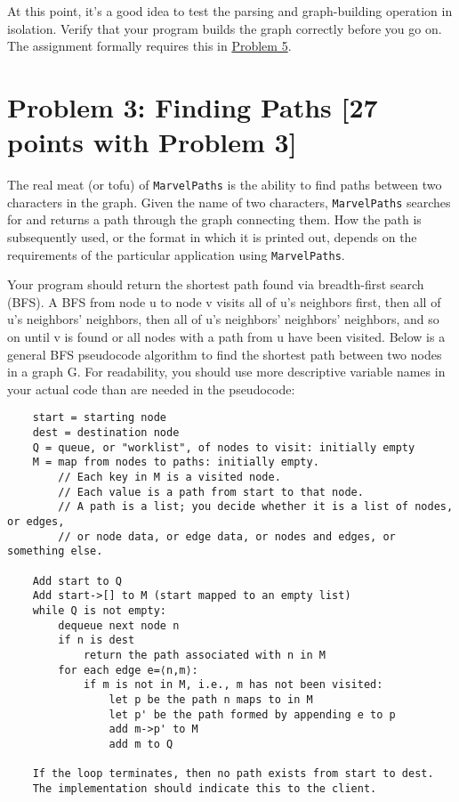 \documentclass[11pt]{article}
\begin{document}
\noindent At this point, it's a good idea to test the parsing and graph-building operation in isolation. Verify that your program builds the graph correctly before you go on. The assignment formally requires this in \hyperref[sec:Problem 5]{Problem 5}.

\section*{Problem 3: Finding Paths [27 points with Problem 3]}
\label{sec:Problem 3}

The real meat (or tofu) of \texttt{MarvelPaths} is the ability to find paths between two characters in the graph. Given the name of two characters, \texttt{MarvelPaths} searches for and returns a path through the graph connecting them. How the path is subsequently used, or the format in which it is printed out, depends on the requirements of the particular application using \texttt{MarvelPaths}.

\noindent Your program should return the shortest path found via breadth-first search (BFS). A BFS from node u to node v visits all of u's neighbors first, then all of u's neighbors' neighbors, then all of u's neighbors' neighbors' neighbors, and so on until v is found or all nodes with a path from u have been visited. Below is a general BFS pseudocode algorithm to find the shortest path between two nodes in a graph G. For readability, you should use more descriptive variable names in your actual code than are needed in the pseudocode:

\begin{verbatim}
    start = starting node
    dest = destination node
    Q = queue, or "worklist", of nodes to visit: initially empty
    M = map from nodes to paths: initially empty.
        // Each key in M is a visited node.
        // Each value is a path from start to that node.
        // A path is a list; you decide whether it is a list of nodes, or edges,
        // or node data, or edge data, or nodes and edges, or something else.
    
    Add start to Q
    Add start->[] to M (start mapped to an empty list)
    while Q is not empty:
        dequeue next node n
        if n is dest
            return the path associated with n in M
        for each edge e=⟨n,m⟩:
            if m is not in M, i.e., m has not been visited:
                let p be the path n maps to in M
                let p' be the path formed by appending e to p
                add m->p' to M
                add m to Q
            
    If the loop terminates, then no path exists from start to dest.
    The implementation should indicate this to the client.
\end{verbatim}
\end{document}

